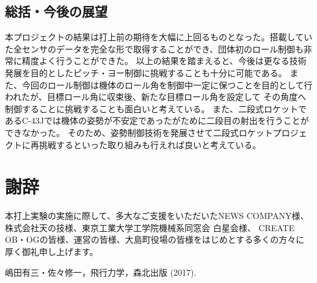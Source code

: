 \documentclass[a4paper,11pt,uplatex]{jsarticle}
\begin{document}
\subsection{総括・今後の展望}
本プロジェクトの結果は打上前の期待を大幅に上回るものとなった。搭載していた全センサのデータを完全な形で取得することができ、団体初のロール制御も非常に精度よく行うことができた。
以上の結果を踏まえると、今後は更なる技術発展を目的としたピッチ・ヨー制御に挑戦することも十分に可能である。
また、今回のロール制御は機体のロール角を制御中一定に保つことを目的として行われたが、目標ロール角に収束後、新たな目標ロール角を設定して
その角度へ制御することに挑戦することも面白いと考えている。
また、二段式ロケットであるC-43Jでは機体の姿勢が不安定であったがために二段目の射出を行うことができなかった。
そのため、姿勢制御技術を発展させて二段式ロケットプロジェクトに再挑戦するといった取り組みも行えれば良いと考えている。

\section{謝辞}
本打上実験の実施に際して、多大なご支援をいただいたNEWS COMPANY様、株式会社天の技様、東京工業大学工学院機械系同窓会 白星会様、
CREATE OB・OGの皆様、運営の皆様、大島町役場の皆様をはじめとする多くの方々に厚く御礼申し上げます。

\begin{thebibliography}{99}
	 嶋田有三・佐々修一，飛行力学，森北出版 (2017).
\end{thebibliography}
\end{document}
